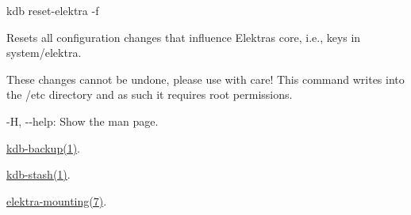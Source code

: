 {\ttfamily kdb reset-\/elektra -\/f}

Resets all configuration changes that influence Elektra\textquotesingle{}s core, i.\+e., keys in {\ttfamily system/elektra}.

These changes cannot be undone, please use with care! This command writes into the {\ttfamily /etc} directory and as such it requires root permissions.


\begin{DoxyItemize}
\item {\ttfamily -\/H}, {\ttfamily -\/-\/help}\+: Show the man page.
\end{DoxyItemize}


\begin{DoxyItemize}
\item \mbox{\hyperlink{doc_help_kdb-backup_md}{kdb-\/backup(1)}}.
\item \mbox{\hyperlink{doc_help_kdb-stash_md}{kdb-\/stash(1)}}.
\item \mbox{\hyperlink{doc_help_elektra-mounting_md}{elektra-\/mounting(7)}}. 
\end{DoxyItemize}